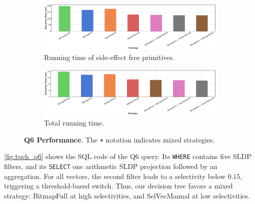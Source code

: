 \documentclass[12pt]{cmuthesis}
\begin{document}
\begin{figure}[t!]
\centering
\hspace*{\fill}%
\begin{subfigure}[t]{.8\linewidth}
 \centering
 \includegraphics[width=0.9\linewidth]{eval/q6_optimized.pdf}
 \caption{Running time of side-effect free primitives.}
  \label{fig:q6_optimized}
\end{subfigure}
\hspace*{\fill}%
\vspace*{8pt}%

\hspace*{\fill}%

\begin{subfigure}[t]{.8\linewidth}
 \centering
 \includegraphics[width=0.9\linewidth]{eval/q6_bench.pdf}
 \caption{Total running time.}
  \label{fig:q6_bench}
\end{subfigure}%

\caption{\textbf{Q6 Performance}. The \texttt{+} notation indicates mixed strategies.}
\label{fig:q6_perf}
\end{figure}

\cref{fig:tpch_q6} shows the SQL code of the Q6 query. Its \texttt{WHERE} contains five SLDP filters, and its \texttt{SELECT} one arithmetic SLDP projection followed by an aggregation. For all vectors, the second filter leads to a selectivity below $0.15$, triggering a threshold-based switch. Thus, our decision tree favors a mixed strategy: BitmapFull at high selectivities, and SelVecManual at low selectivities.
\end{document}
